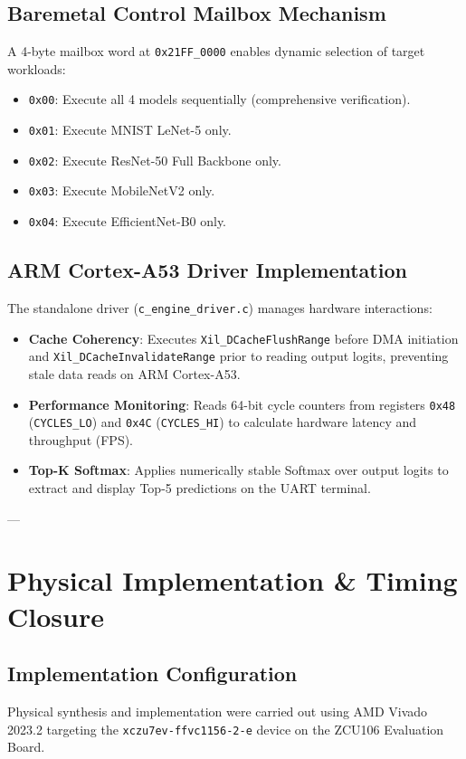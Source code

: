 \documentclass[10pt,journal,compsoc]{IEEEtran}
\begin{document}
\subsection{Baremetal Control Mailbox Mechanism}
A 4-byte mailbox word at \texttt{0x21FF\_0000} enables dynamic selection of target workloads:
\begin{itemize}
    \item \texttt{0x00}: Execute all 4 models sequentially (comprehensive verification).
    \item \texttt{0x01}: Execute MNIST LeNet-5 only.
    \item \texttt{0x02}: Execute ResNet-50 Full Backbone only.
    \item \texttt{0x03}: Execute MobileNetV2 only.
    \item \texttt{0x04}: Execute EfficientNet-B0 only.
\end{itemize}

\subsection{ARM Cortex-A53 Driver Implementation}
The standalone driver (\texttt{c\_engine\_driver.c}) manages hardware interactions:
\begin{itemize}
    \item \textbf{Cache Coherency}: Executes \texttt{Xil\_DCacheFlushRange} before DMA initiation and \texttt{Xil\_DCacheInvalidateRange} prior to reading output logits, preventing stale data reads on ARM Cortex-A53.
    \item \textbf{Performance Monitoring}: Reads 64-bit cycle counters from registers \texttt{0x48} (\texttt{CYCLES\_LO}) and \texttt{0x4C} (\texttt{CYCLES\_HI}) to calculate hardware latency and throughput (FPS).
    \item \textbf{Top-K Softmax}: Applies numerically stable Softmax over output logits to extract and display Top-5 predictions on the UART terminal.
\end{itemize}

---

\section{Physical Implementation \& Timing Closure}

\subsection{Implementation Configuration}
Physical synthesis and implementation were carried out using AMD Vivado 2023.2 targeting the \texttt{xczu7ev-ffvc1156-2-e} device on the ZCU106 Evaluation Board.
\end{document}
